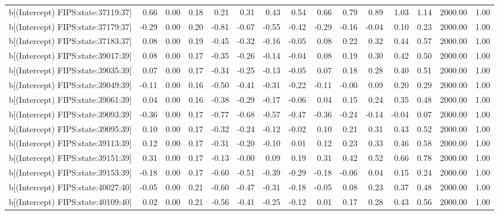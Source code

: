 \begin{table}[ht]
\begin{tabular}{rrrrrrrrrrrrrrr}
  b[(Intercept) FIPS:state:37119:37] & 0.66 & 0.00 & 0.18 & 0.21 & 0.31 & 0.43 & 0.54 & 0.66 & 0.79 & 0.89 & 1.03 & 1.14 & 2000.00 & 1.00 \\ 
  b[(Intercept) FIPS:state:37179:37] & -0.29 & 0.00 & 0.20 & -0.81 & -0.67 & -0.55 & -0.42 & -0.29 & -0.16 & -0.04 & 0.10 & 0.23 & 2000.00 & 1.00 \\ 
  b[(Intercept) FIPS:state:37183:37] & 0.08 & 0.00 & 0.19 & -0.45 & -0.32 & -0.16 & -0.05 & 0.08 & 0.22 & 0.32 & 0.44 & 0.57 & 2000.00 & 1.00 \\ 
  b[(Intercept) FIPS:state:39017:39] & 0.08 & 0.00 & 0.17 & -0.35 & -0.26 & -0.14 & -0.04 & 0.08 & 0.19 & 0.30 & 0.42 & 0.50 & 2000.00 & 1.00 \\ 
  b[(Intercept) FIPS:state:39035:39] & 0.07 & 0.00 & 0.17 & -0.34 & -0.25 & -0.13 & -0.05 & 0.07 & 0.18 & 0.28 & 0.40 & 0.51 & 2000.00 & 1.00 \\ 
  b[(Intercept) FIPS:state:39049:39] & -0.11 & 0.00 & 0.16 & -0.50 & -0.41 & -0.31 & -0.22 & -0.11 & -0.00 & 0.09 & 0.20 & 0.29 & 2000.00 & 1.00 \\ 
  b[(Intercept) FIPS:state:39061:39] & 0.04 & 0.00 & 0.16 & -0.38 & -0.29 & -0.17 & -0.06 & 0.04 & 0.15 & 0.24 & 0.35 & 0.48 & 2000.00 & 1.00 \\ 
  b[(Intercept) FIPS:state:39093:39] & -0.36 & 0.00 & 0.17 & -0.77 & -0.68 & -0.57 & -0.47 & -0.36 & -0.24 & -0.14 & -0.04 & 0.07 & 2000.00 & 1.00 \\ 
  b[(Intercept) FIPS:state:39095:39] & 0.10 & 0.00 & 0.17 & -0.32 & -0.24 & -0.12 & -0.02 & 0.10 & 0.21 & 0.31 & 0.43 & 0.52 & 2000.00 & 1.00 \\ 
  b[(Intercept) FIPS:state:39113:39] & 0.12 & 0.00 & 0.17 & -0.31 & -0.20 & -0.10 & 0.01 & 0.12 & 0.23 & 0.33 & 0.46 & 0.58 & 2000.00 & 1.00 \\ 
  b[(Intercept) FIPS:state:39151:39] & 0.31 & 0.00 & 0.17 & -0.13 & -0.00 & 0.09 & 0.19 & 0.31 & 0.42 & 0.52 & 0.66 & 0.78 & 2000.00 & 1.00 \\ 
  b[(Intercept) FIPS:state:39153:39] & -0.18 & 0.00 & 0.17 & -0.60 & -0.51 & -0.39 & -0.29 & -0.18 & -0.06 & 0.04 & 0.15 & 0.24 & 2000.00 & 1.00 \\ 
  b[(Intercept) FIPS:state:40027:40] & -0.05 & 0.00 & 0.21 & -0.60 & -0.47 & -0.31 & -0.18 & -0.05 & 0.08 & 0.23 & 0.37 & 0.48 & 2000.00 & 1.00 \\ 
  b[(Intercept) FIPS:state:40109:40] & 0.02 & 0.00 & 0.21 & -0.56 & -0.41 & -0.25 & -0.12 & 0.01 & 0.17 & 0.28 & 0.43 & 0.56 & 2000.00 & 1.00 \\ 

\end{tabular}
\end{table}
